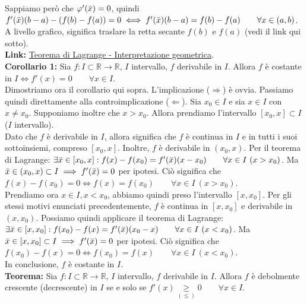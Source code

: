\documentclass{article}
\begin{document}
\noindent Sappiamo però che $\varphi'(\Bar{x}) = 0$, quindi $f'(\Bar{x})(b - a) - (f(b) - f(a)) = 0 \iff f'(\Bar{x})(b - a) = f(b) - f(a) \qquad \forall x \in (a, b)$. A livello grafico, significa traslare la retta secante $f(b)$ e $f(a)$ (vedi il link qui sotto). \\

\noindent\textbf{Link:} \href{https://www.geogebra.org/m/z9y24ehK}{Teorema di Lagrange - Interpretazione geometrica}.\\

\noindent\textbf{Corollario 1:} Sia $f: I \subset \mathbb{R} \xrightarrow{} \mathbb{R}$, $I$ intervallo, $f$ derivabile in $I$. Allora $f$ è costante in $I \iff f'(x) = 0 \qquad \forall x \in I$.\\

\noindent Dimostriamo ora il corollario qui sopra. L'implicazione ($\Rightarrow$) è ovvia. Passiamo quindi direttamente alla controimplicazione ($\Leftarrow$). Sia $x_0 \in I$ e sia $x \in I$ con $x \neq x_0$. Supponiamo inoltre che $x > x_0$. Allora prendiamo l'intervallo $[x_0, x] \subset I$ ($I$ intervallo).\\
Dato che $f$ è derivabile in $I$, allora significa che $f$ è continua in $I$ e in tutti i suoi sottoinsiemi, compreso $[x_0, x]$. Inoltre, $f$ è derivabile in $(x_0, x)$. Per il teorema di Lagrange: $\exists \Bar{x} \in [x_0, x] : f(x) - f(x_0) = f'(\Bar{x})(x - x_0) \qquad \forall x \in I \ (x > x_0)$. Ma $\Bar{x} \in (x_0, x) \subset I \implies f'(\Bar{x}) = 0$ per ipotesi. Ciò significa che $f(x) - f(x_0) = 0 \iff f(x) = f(x_0) \qquad \forall x \in I \ (x > x_0)$.\\
Prendiamo ora $x \in I, x < x_0$, abbiamo quindi preso l'intervallo $[x, x_0]$. Per gli stessi motivi enunciati precedentemente, $f$ è continua in $[x, x_0]$ e derivabile in $(x, x_0)$. Possiamo quindi applicare il teorema di Lagrange: $\exists \Bar{x} \in [x, x_0] : f(x_0) - f(x) = f'(\Bar{x})(x_0 - x) \qquad \forall x \in I \ (x < x_0)$. Ma $\Bar{x} \in [x, x_0] \subset I \implies f'(\Bar{x}) = 0$ per ipotesi. Ciò significa che $f(x_0) - f(x) = 0 \iff f(x_0) = f(x) \qquad \forall x \in I \ (x < x_0)$.\\
In conclusione, $f$ è costante in $I$.\\

\noindent\textbf{Teorema:} Sia $f: I \subset \mathbb{R} \xrightarrow{} \mathbb{R}$, $I$ intervallo, $f$ derivabile in $I$. Allora $f$ è debolmente crescente (decrescente) in $I$ se e solo se $f'(x) \underset{(\leq)}{\geq} 0 \qquad \forall x \in I$.\\
\end{document}
